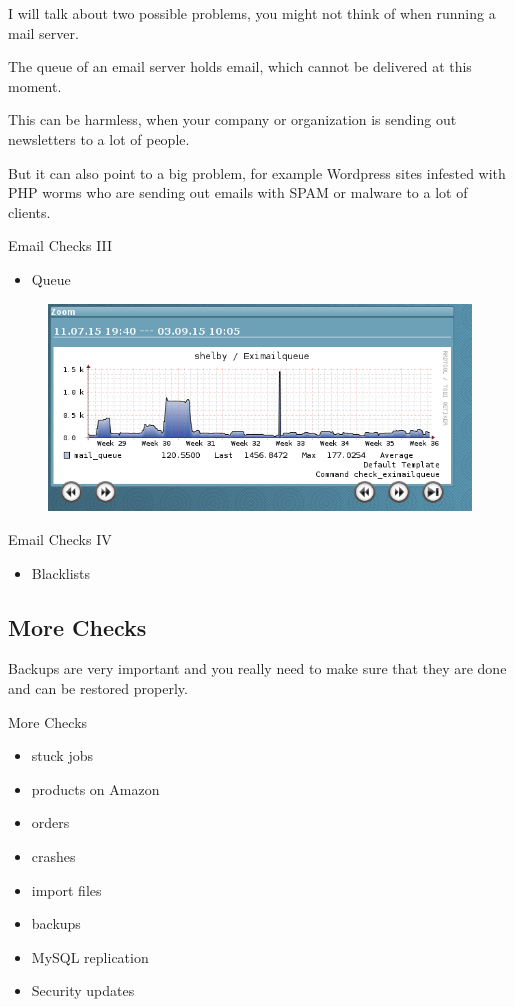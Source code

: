 I will talk about two possible problems,
you might not think of when running a mail server.

The queue of an email server holds email, which
cannot be delivered at this moment.

This can be harmless, when your company or organization
is sending out newsletters to a lot of people.

But it can also point to a big problem, for example
Wordpress sites infested with PHP worms who are
sending out emails with SPAM or malware to a lot
of clients.

\begin{frame}{Email Checks III}
\begin{itemize}
\item Queue
\end{itemize}
\begin{figure}
\includegraphics[width=\textwidth]{images/mailqueue.png}
\end{figure}
\end{frame}

\begin{frame}{Email Checks IV}
\begin{itemize}
\item Blacklists
\end{itemize}
\end{frame}

\subsection{More Checks}

Backups are very important and you really need to make sure
that they are done and can be restored properly.

\begin{frame}[fragile]{More Checks}

\begin{itemize}
\item stuck jobs
\item products on Amazon
\item orders
\item crashes
\item import files
\item backups
\item MySQL replication
\item Security updates
\end{itemize}
\end{frame}

